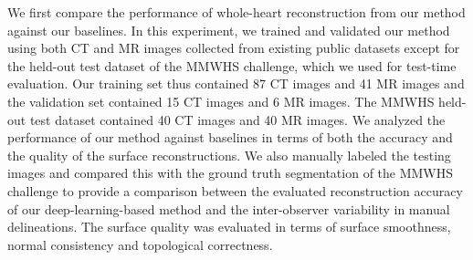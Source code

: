 \documentclass[times,review,preprint,authoryear]{elsarticle}
\begin{document}
We first compare the performance of whole-heart reconstruction from our method against our baselines. In this experiment, we trained and validated our method using both CT and MR images collected from existing public datasets except for the held-out test dataset of the MMWHS challenge, which we used for test-time evaluation. Our training set thus contained 87 CT images and 41 MR images and the validation set contained 15 CT images and 6 MR images. The MMWHS held-out test dataset contained 40 CT images and 40 MR images. We analyzed the performance of our method against baselines in terms of both the accuracy and the quality of the surface reconstructions. We also manually labeled the testing images and compared this with the ground truth segmentation of the MMWHS challenge to provide a comparison between the evaluated reconstruction accuracy of our deep-learning-based method and the inter-observer variability in manual delineations. The surface quality was evaluated in terms of surface smoothness, normal consistency and topological correctness.
\end{document}
